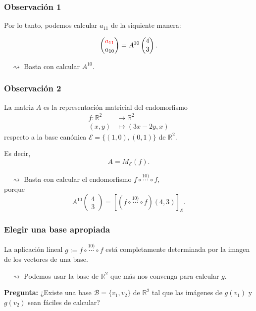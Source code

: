 \documentclass[12pt]{beamer}
\begin{document}
\begin{frame}
  \frametitle{Observación 1}
  Por lo tanto, podemos calcular $a_{11}$ de la siquiente manera:

  \[
    \begin{pmatrix}
      {\color{red}a_{11}} \\
      a_{10}
    \end{pmatrix}
    =
    A^{10}
    \begin{pmatrix}
      4 \\
      3
    \end{pmatrix}.
  \]
  \pause

  \vfill
  $\quad \rightsquigarrow$ Basta con calcular $A^{10}$.
\end{frame}

\begin{frame}
  \frametitle{Observación 2}
  La matriz $A$ es la representación matricial del endomorfismo
  \begin{align*}
    f \colon \mathbb{R}^{2} & \to \mathbb{R}^{2} \\
    (x,y) & \mapsto (3x-2y,x)
  \end{align*}
  respecto a la base canónica $\mathcal{E} = \{ (1,0), (0,1) \}$ de $\mathbb{R}^{2}$.
  \pause

  Es decir,
  \[
    A = M_{\mathcal{E}}(f).
  \]
  \pause

  $\quad \rightsquigarrow$ Basta con calcular el endomorfismo $f \circ \overset{10)}{\cdots} \circ f$, \\
  porque
  \[
    A^{10}
    \begin{pmatrix}
      4 \\
      3
    \end{pmatrix}
    = [(f \circ \overset{10)}{\cdots} \circ f)(4,3)]_{\mathcal{E}}.
  \]

\end{frame}


\begin{frame}
  \frametitle{Elegir una base apropiada}
  La aplicación lineal $g := f \circ \overset{10)}{\cdots} \circ f$ está completamente determinada por la imagen de los vectores de una base.
  \pause

  \vspace{5mm}
  $\quad \rightsquigarrow$ Podemos usar la base de $\mathbb{R}^{2}$ que más nos convenga para calcular $g$.
  \pause
  
  \vspace{5mm}
  \textbf{Pregunta:}
  ¿Existe una base $\mathcal{B} = \{ v_{1}, v_{2} \}$ de $\mathbb{R}^{2}$ tal que las imágenes de $g(v_{1})$ y $g(v_{2})$ sean fáciles de calcular?
  
    
\end{frame}
\end{document}
